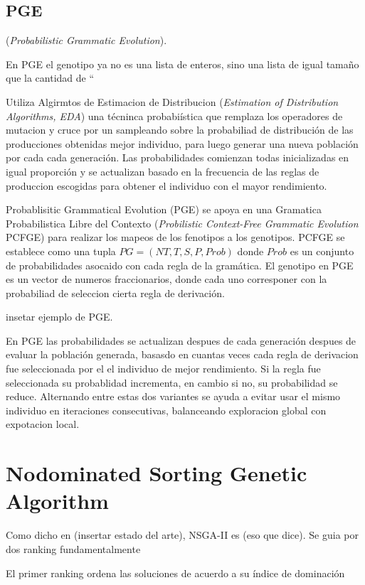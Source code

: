 \subsection{PGE}
 (\textit{Probabilistic Grammatic Evolution}).

En PGE el genotipo ya no es una lista de enteros, sino una lista de igual tamaño que la cantidad de ``

Utiliza Algirmtos de Estimacion de Distribucion (\textit{Estimation of Distribution Algorithms, EDA}) una t\'ecninca probabi\'istica que remplaza los operadores de mutacion y cruce por un sampleando sobre la probabiliad de distribuci\'on de las producciones obtenidas mejor individuo, para luego generar una nueva poblaci\'on por cada cada generaci\'on. Las probabilidades comienzan todas inicializadas en igual proporci\'on  y se actualizan basado en la frecuencia de las reglas de produccion escogidas para obtener el individuo con el mayor rendimiento.

Probablisitic Grammatical Evolution (PGE)  se apoya en una Gramatica Probabilistica Libre del Contexto (\textit{Probilistic Context-Free Grammatic Evolution} PCFGE) para realizar los mapeos de los fenotipos a los genotipos. PCFGE se establece como una tupla $PG = (NT, T, S, P, Prob)$ donde $Prob$  es un conjunto de probabilidades asocaido con cada regla de la gram\'atica. El genotipo en PGE es un vector de numeros fraccionarios, donde cada uno corresponer con la probabiliad de seleccion cierta regla de derivaci\'on.

insetar ejemplo de PGE.

En PGE las probabilidades se actualizan despues de cada generaci\'on  despues de evaluar la poblaci\'on generada, basasdo en cuantas veces cada regla de derivacion fue seleccionada por el el individuo de mejor rendimiento. Si la regla fue seleccionada su probablidad incrementa, en cambio si no, su probabilidad se reduce. Alternando entre estas dos variantes se ayuda a evitar usar el mismo individuo en iteraciones consecutivas, balanceando exploracion global con expotacion local.

\section{Nodominated Sorting Genetic Algorithm}

Como dicho en (insertar estado del arte), NSGA-II es (eso que dice). Se guia por dos ranking fundamentalmente

El primer ranking ordena las soluciones de acuerdo a su \'indice de dominaci\'on

